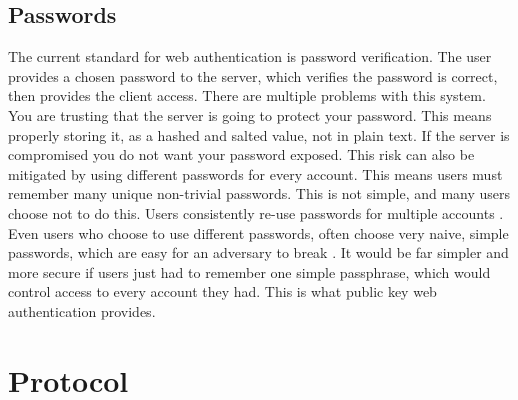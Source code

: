 \documentclass[11pt]{article}
\begin{document}
\subsection{Passwords} \label{subsec:passwords}
The current standard for web authentication is password verification. The user provides a chosen password to the server, which verifies the password is correct, then provides the client access. There are multiple problems with this system.\\
You are trusting that the server is going to protect your password. This means properly storing it, as a hashed and salted value, not in plain text. If the server is compromised you do not want your password exposed. This risk can also be mitigated by using different passwords for every account. This means users must remember many unique non-trivial passwords. This is not simple, and many users choose not to do this. Users consistently re-use passwords for multiple accounts \cite{domino}. Even users who choose to use different passwords, often choose very naive, simple passwords, which are easy for an adversary to break \cite{habits}. It would be far simpler and more secure if users just had to remember one simple passphrase, which would control access to every account they had. This is what public key web authentication provides. 
\section{Protocol} \label{sec:protocol}
\end{document}
